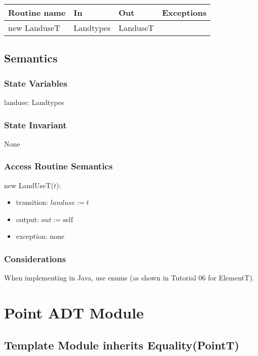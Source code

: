 \documentclass[12pt]{article}
\begin{document}
\begin{tabular}{| l | l | l | p{5cm} |}
\hline
\textbf{Routine name} & \textbf{In} & \textbf{Out} & \textbf{Exceptions}\\
\hline
new LanduseT & Landtypes & LanduseT & ~\\
\hline
\end{tabular}

\subsection* {Semantics}

\subsubsection* {State Variables}

landuse: Landtypes

\subsubsection* {State Invariant}

None

\subsubsection* {Access Routine Semantics}

\noindent new LandUseT($t$):
\begin{itemize}
\item transition: $\mathit{landuse} := t$
\item output: $out := \mbox{self}$
\item exception: none
\end{itemize}

\subsubsection* {Considerations}

When implementing in Java, use enums (as shown in Tutorial 06 for ElementT).

\newpage

\section* {Point ADT Module}

\subsection*{Template Module inherits Equality(PointT)}
\end{document}
